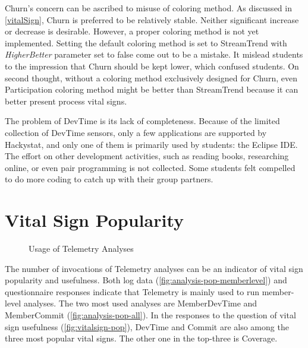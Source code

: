 Churn's concern can be ascribed to misuse of coloring method. As discussed in \autoref{vitalSign}, Churn is preferred to be relatively stable. Neither significant increase or decrease is desirable. However, a proper coloring method is not yet implemented. Setting the default coloring method is set to StreamTrend with {\it HigherBetter} parameter set to false come out to be a mistake. It mislead students to the impression that Churn should be kept lower, which confused students. On second thought, without a coloring method exclusively designed for Churn, even Participation coloring method might be better than StreamTrend because it can better present process vital signs.

The problem of DevTime is its lack of completeness. Because of the limited collection of DevTime sensors, only a few applications are supported by Hackystat, and only one of them is primarily used by students: the Eclipse IDE. The effort on other development activities, such as reading books, researching online, or even pair programming is not collected. Some students felt compelled to do more coding to catch up with their group partners.


\section {Vital Sign Popularity}

\begin{figure}[htbp] %
   \centering     
   \vspace{.3in}
   \caption{Usage of Telemetry Analyses}
   \label{fig:analysis-pop}
\end{figure}

The number of invocations of Telemetry analyses can be an indicator of vital sign popularity and usefulness. Both log data (\autoref{fig:analysis-pop-memberlevel}) and questionnaire responses indicate that Telemetry is mainly used to run member-level analyses. The two most used analyses are MemberDevTime and MemberCommit (\autoref{fig:analysis-pop-all}). In the responses to the question of vital sign usefulness (\autoref{fig:vitalsign-pop}), DevTime and Commit are also among the three most popular vital signs. The other one in the top-three is Coverage. 

